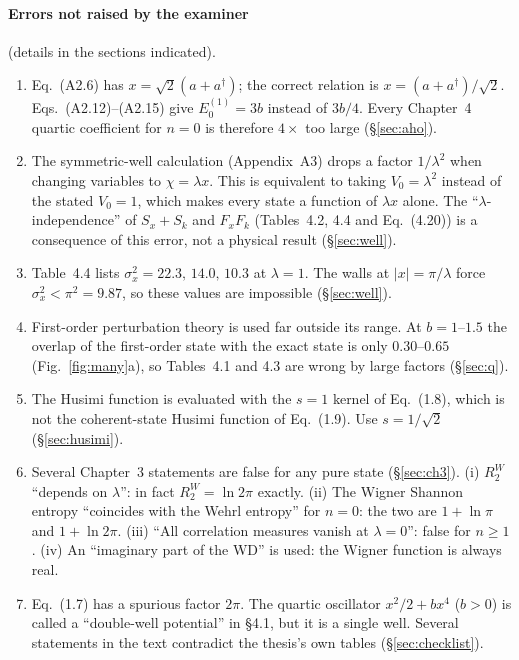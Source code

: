 \documentclass[11pt,a4paper]{article}
\newcommand{\Eq}[1]{Eq.~(#1)}
\begin{document}
\paragraph{Errors not raised by the examiner} (details in the sections indicated).
\begin{enumerate}[label=(\alph*)]
\item \Eq{A2.6} has $x=\sqrt2(a+a^\dagger)$; the correct relation is $x=(a+a^\dagger)/\sqrt2$.
  Eqs.~(A2.12)--(A2.15) give $E_0^{(1)}=3b$ instead of $3b/4$. Every Chapter~4 quartic
  coefficient for $n=0$ is therefore $4\times$ too large (\S\ref{sec:aho}).
\item The symmetric-well calculation (Appendix~A3) drops a factor $1/\lambda^2$ when changing
  variables to $\chi=\lambda x$. This is equivalent to taking $V_0=\lambda^2$ instead of the
  stated $V_0=1$, which makes every state a function of $\lambda x$ alone. The
  ``$\lambda$-independence'' of $S_x+S_k$ and $F_xF_k$ (Tables~4.2, 4.4 and \Eq{4.20}) is a
  consequence of this error, not a physical result (\S\ref{sec:well}).
\item Table~4.4 lists $\sigma_x^2=22.3,\,14.0,\,10.3$ at $\lambda=1$. The walls at
  $|x|=\pi/\lambda$ force $\sigma_x^2<\pi^2=9.87$, so these values are impossible
  (\S\ref{sec:well}).
\item First-order perturbation theory is used far outside its range. At $b=1$--$1.5$ the
  overlap of the first-order state with the exact state is only $0.30$--$0.65$
  (Fig.~\ref{fig:many}a), so Tables~4.1 and 4.3 are wrong by large factors (\S\ref{sec:q}).
\item The Husimi function is evaluated with the $s=1$ kernel of \Eq{1.8}, which is not the
  coherent-state Husimi function of \Eq{1.9}. Use $s=1/\sqrt2$ (\S\ref{sec:husimi}).
\item Several Chapter~3 statements are false for any pure state (\S\ref{sec:ch3}). (i)
  $R_2^W$ ``depends on $\lambda$'': in fact $R_2^W=\ln2\pi$ exactly. (ii) The Wigner Shannon
  entropy ``coincides with the Wehrl entropy'' for $n=0$: the two are $1+\ln\pi$ and
  $1+\ln2\pi$. (iii) ``All correlation measures vanish at $\lambda=0$'': false for $n\ge1$.
  (iv) An ``imaginary part of the WD'' is used: the Wigner function is always real.
\item \Eq{1.7} has a spurious factor $2\pi$. The quartic oscillator $x^2/2+bx^4$ ($b>0$) is
  called a ``double-well potential'' in \S4.1, but it is a single well. Several statements in
  the text contradict the thesis's own tables (\S\ref{sec:checklist}).
\end{enumerate}
\end{document}
